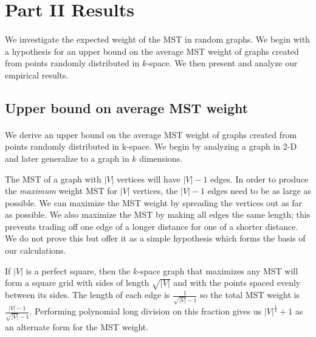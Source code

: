 \section{Part II Results}
\label{sec:part2}

\paragraph{}
We investigate the expected weight of the MST in random graphs. We begin with a
hypothesis for an upper bound on the average MST weight of graphs created from
points randomly distributed in $k$-space. We then present and analyze our
empirical results.


\subsection{Upper bound on average MST weight}
\paragraph{}
We derive an upper bound on the average MST weight of graphs created
from points randomly distributed in k-space. We begin by analyzing a graph in
2-D and later generalize to a graph in $k$ dimensions.

The MST of a graph with $|V|$ vertices will have $|V|-1$ edges. In order to
produce the \textit{maximum} weight MST for $|V|$ vertices, the $|V|-1$ edges
need to be as large as possible. We can maximize the MST weight by spreading
the vertices out as far as possible. We also maximize the MST by making all
edges the same length; this prevents trading off one edge of a longer distance
for one of a shorter distance. We do not prove this but offer it as a simple
hypothesis which forms the basis of our calculations.

If $|V|$ is a perfect square, then the $k$-space graph that maximizes any MST will form a
square grid with sides of length $\sqrt{|V|}$ and with the points spaced evenly
between its sides. The length of each edge is $\frac{1}{\sqrt{|V|}-1}$ so the
total MST weight is $\frac{|V|-1}{\sqrt{|V|}-1}$. Performing polynomial long
division on this fraction gives us $|V|^{\frac{1}{2}}+1$ as an alternate form
for the MST weight.


